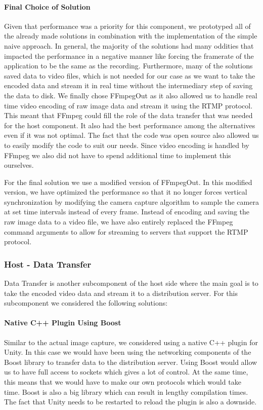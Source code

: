 \paragraph{Final Choice of Solution}
Given that performance was a priority for this component, we prototyped all of the already made solutions in combination with the implementation of the simple naive approach. In general, the majority of the solutions had many oddities that impacted the performance in a negative manner like forcing the framerate of the application to be the same as the recording. Furthermore, many of the solutions saved data to video files, which is not needed for our case as we want to take the encoded data and stream it in real time without the intermediary step of saving the data to disk. We finally chose FFmpegOut as it also allowed us to handle real time video encoding of raw image data and stream it using the RTMP protocol. This meant that FFmpeg could fill the role of the data transfer that was needed for the host component. It also had the best performance among the alternatives even if it was not optimal. The fact that the code was open source also allowed us to easily modify the code to suit our needs. Since video encoding is handled by FFmpeg we also did not have to spend additional time to implement this ourselves. 

For the final solution we use a modified version of FFmpegOut. In this modified version, we have optimized the performance so that it no longer forces vertical synchronization by modifying the camera capture algorithm to sample the camera at set time intervals instead of every frame. Instead of encoding and saving the raw image data to a video file, we have also entirely replaced the FFmpeg command arguments to allow for streaming to servers that support the RTMP protocol. 
    
\subsubsection{Host - Data Transfer} %
Data Transfer is another subcomponent of the host side where the main goal is to take the encoded video data and stream it to a distribution server. For this subcomponent we considered the following solutions:

\paragraph{Native C++ Plugin Using Boost}
Similar to the actual image capture, we considered using a native C++ plugin for Unity. In this case we would have been using the networking components of the Boost library\cite{boost} to transfer data to the distribution server. Using Boost would allow us to have full access to sockets which gives a lot of control. At the same time, this means that we would have to make our own protocols which would take time. Boost is also a big library which can result in lengthy compilation times. The fact that Unity needs to be restarted to reload the plugin is also a downside. 

